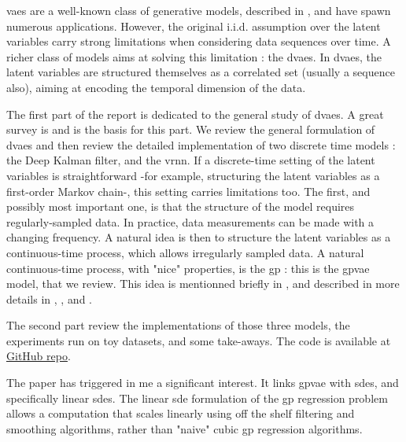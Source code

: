 

\glspl{vae} are a well-known class of generative models, described in \cite{kingma_introduction_2019}, and have spawn numerous applications. However, the original i.i.d. 
assumption over the latent variables carry strong limitations when considering data sequences over time. 
A richer class of models aims at solving this limitation : the \glspl{dvae}. In \glspl{dvae}, the latent variables are structured themselves as a correlated set (usually a sequence also),
 aiming at encoding the temporal dimension of the data. 

The first part of the report is dedicated to the general study of \glspl{dvae}. A great survey is \cite{girin_dynamical_2022} and is the basis for this part. 
We review the general formulation of \glspl{dvae} and then review the detailed implementation of two discrete time models : the Deep Kalman filter, and the \gls{vrnn}. 
If a discrete-time setting of the latent variables is straightforward -for example, structuring the latent variables as a first-order Markov chain-, this setting carries limitations too. 
The first, and possibly most important one, is that the structure of the model requires regularly-sampled data. In practice, data measurements can be made 
with a changing frequency. A natural idea is then to structure the latent variables as a continuous-time process, which allows irregularly sampled data. 
A natural continuous-time process, with "nice" properties, is the \gls{gp} \cite{rasmussen_gaussian_2008} : this is the \gls{gpvae} model, that we review.
This idea is mentionned briefly in \cite{girin_dynamical_2022}, and described in more details in \cite{casale_gaussian_2018}, 
\cite{fortuin_gp-vae:_2020}, \cite{titsias_bayesian_2010} and \cite{zhu_markovian_2023}. 

The second part review the implementations of those three models, the experiments run on toy datasets, and some take-aways.
The code is available at \href{https://github.com/BenjaminDeporte/MVA_Stage}{GitHub repo}.

The paper \cite{zhu_markovian_2023} has triggered in me a significant interest. It links \gls{gpvae} with \glspl{sde}, and specifically linear \glspl{sde}. 
The linear \gls{sde} formulation of the \gls{gp} regression problem allows a computation that scales linearly using off the shelf filtering and smoothing algorithms,
rather than "naive" cubic \gls{gp} regression algorithms. 

